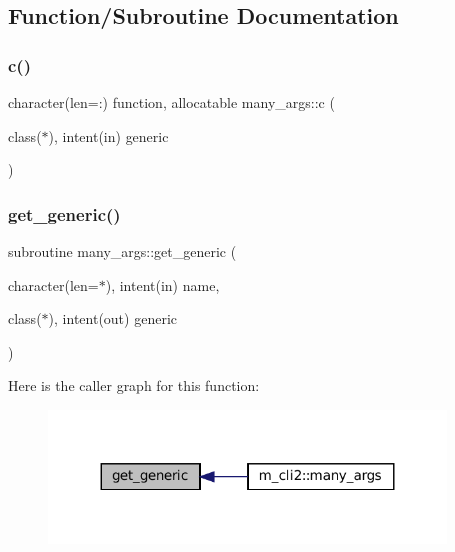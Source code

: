 \subsection{Function/\+Subroutine Documentation}
\mbox{\label{M__CLI2_8f90_a8e39955a72727c584de84fedd23a25c4}} 
\subsubsection{\texorpdfstring{c()}{c()}}
{\footnotesize\ttfamily character(len=\+:) function, allocatable many\+\_\+args\+::c (\begin{DoxyParamCaption}\item[{class($\ast$), intent(in)}]{generic }\end{DoxyParamCaption})\hspace{0.3cm}{\ttfamily [private]}}

\mbox{\label{M__CLI2_8f90_a63bc2e1acc64ef4241b6419c18d80877}} 
\subsubsection{\texorpdfstring{get\+\_\+generic()}{get\_generic()}}
{\footnotesize\ttfamily subroutine many\+\_\+args\+::get\+\_\+generic (\begin{DoxyParamCaption}\item[{character(len=$\ast$), intent(in)}]{name,  }\item[{class($\ast$), intent(out)}]{generic }\end{DoxyParamCaption})\hspace{0.3cm}{\ttfamily [private]}}

Here is the caller graph for this function\+:\nopagebreak
\begin{figure}[H]
\begin{center}
\leavevmode
\includegraphics[width=299pt]{M__CLI2_8f90_a63bc2e1acc64ef4241b6419c18d80877_icgraph}
\end{center}
\end{figure}
\mbox{\label{M__CLI2_8f90_aa26f90016621d1ee43d3b5b66316532b}} 
